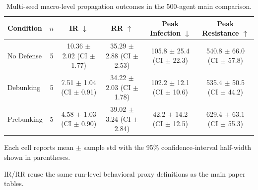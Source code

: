 \begin{table}[t]
\centering
\small
\caption{Multi-seed macro-level propagation outcomes in the 500-agent main comparison.}
\label{tab:main_multiseed_macro_results}
\begin{threeparttable}
\begin{tabular}{lccccc}
\toprule
Condition & $n$ & IR $\downarrow$ & RR $\uparrow$ & Peak Infection $\downarrow$ & Peak Resistance $\uparrow$ \\
\midrule
No Defense & 5 & 10.36 $\pm$ 2.02 (CI $\pm$ 1.77) & 35.29 $\pm$ 2.88 (CI $\pm$ 2.53) & 105.8 $\pm$ 25.4 (CI $\pm$ 22.3) & 540.8 $\pm$ 66.0 (CI $\pm$ 57.8) \\
Debunking & 5 & 7.51 $\pm$ 1.04 (CI $\pm$ 0.91) & 34.22 $\pm$ 2.03 (CI $\pm$ 1.78) & 102.2 $\pm$ 12.1 (CI $\pm$ 10.6) & 535.4 $\pm$ 50.5 (CI $\pm$ 44.2) \\
Prebunking & 5 & 4.58 $\pm$ 1.03 (CI $\pm$ 0.90) & 39.02 $\pm$ 3.24 (CI $\pm$ 2.84) & 42.2 $\pm$ 14.2 (CI $\pm$ 12.5) & 629.4 $\pm$ 63.1 (CI $\pm$ 55.3) \\
\bottomrule
\end{tabular}
\begin{tablenotes}[flushleft]
\footnotesize
\item Each cell reports mean $\pm$ sample std with the 95\% confidence-interval half-width shown in parentheses.
\item IR/RR reuse the same run-level behavioral proxy definitions as the main paper tables.
\end{tablenotes}
\end{threeparttable}
\end{table}
